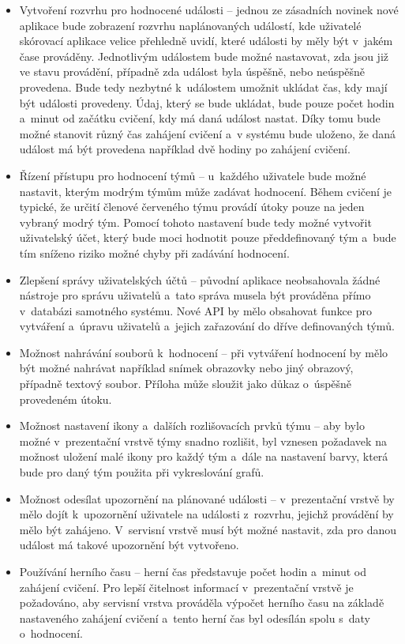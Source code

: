 \documentclass[
  digital,
  twoside,
  table, 
  nolof, 
  nolot
]{fithesis3}
\begin{document}
\begin{itemize}
\item Vytvoření rozvrhu pro hodnocené události -- jednou ze zásadních novinek nové aplikace bude zobrazení rozvrhu naplánovaných událostí, kde uživatelé skórovací aplikace velice přehledně uvidí, které události by měly být v~jakém čase prováděny. Jednotlivým událostem bude možné nastavovat, zda jsou již ve stavu provádění, případně zda událost byla úspěšně, nebo neúspěšně provedena. Bude tedy nezbytné k~událostem umožnit ukládat čas, kdy mají být události provedeny. Údaj, který se bude ukládat, bude pouze počet hodin a~minut od začátku cvičení, kdy má daná událost nastat. Díky tomu bude možné stanovit různý čas zahájení cvičení a~v systému bude uloženo, že daná událost má být provedena například dvě hodiny po zahájení cvičení.
\item Řízení přístupu pro hodnocení týmů -- u~každého uživatele bude možné nastavit, kterým modrým týmům může zadávat hodnocení. Během cvičení je typické, že určití členové červeného týmu provádí útoky pouze na jeden vybraný modrý tým. Pomocí tohoto nastavení bude tedy možné vytvořit uživatelský účet, který bude moci hodnotit pouze předdefinovaný tým a~bude tím sníženo riziko možné chyby při zadávání hodnocení.
\item Zlepšení správy uživatelských účtů -- původní aplikace neobsahovala žádné nástroje pro správu uživatelů a~tato správa musela být prováděna přímo v~databázi samotného systému. Nové API by mělo obsahovat funkce pro vytváření a~úpravu uživatelů a~jejich zařazování do dříve definovaných týmů.
\item Možnost nahrávání souborů k~hodnocení -- při vytváření hodnocení by mělo být možné nahrávat například snímek obrazovky nebo jiný obrazový, případně textový soubor. Příloha může sloužit jako důkaz o~úspěšně provedeném útoku.
\item Možnost nastavení ikony a~dalších rozlišovacích prvků týmu -- aby bylo možné v~prezentační vrstvě týmy snadno rozlišit, byl vznesen požadavek na možnost uložení malé ikony pro každý tým a~dále na nastavení barvy, která bude pro daný tým použita při vykreslování grafů.
\item Možnost odesílat upozornění na plánované události -- v~prezentační vrstvě by mělo dojít k~upozornění uživatele na události z~rozvrhu, jejichž provádění by mělo být zahájeno. V~servisní vrstvě musí být možné nastavit, zda pro danou událost má takové upozornění být vytvořeno.
\item Používání herního času -- herní čas představuje počet hodin a~minut od zahájení cvičení. Pro lepší čitelnost informací v~prezentační vrstvě je požadováno, aby servisní vrstva prováděla výpočet herního času na základě nastaveného zahájení cvičení a~tento herní čas byl odesílán spolu s~daty o~hodnocení.
\end{itemize}
\end{document}
